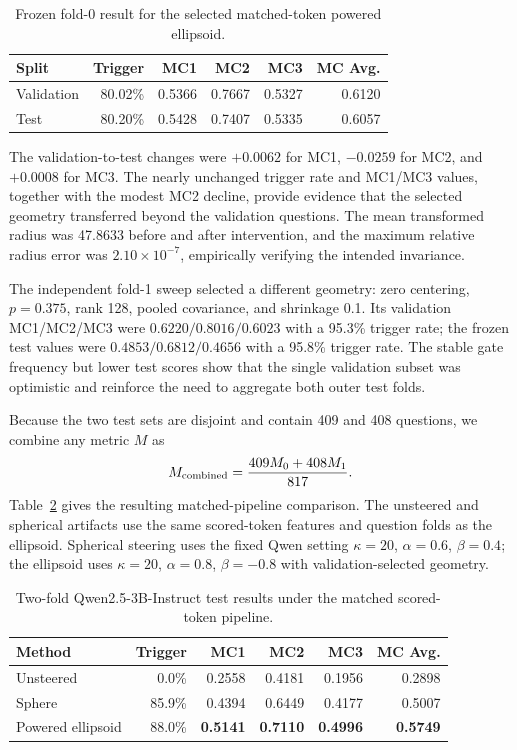 \documentclass[11pt]{article}
\begin{document}
\begin{table}[ht]
\centering
\caption{Frozen fold-0 result for the selected matched-token powered ellipsoid.}
\label{tab:powered-result}
\begin{tabular}{lrrrrr}
\toprule
Split & Trigger & MC1 & MC2 & MC3 & MC Avg.\\
\midrule
Validation & 80.02\% & 0.5366 & 0.7667 & 0.5327 & 0.6120\\
Test       & 80.20\% & 0.5428 & 0.7407 & 0.5335 & 0.6057\\
\bottomrule
\end{tabular}
\end{table}

The validation-to-test changes were $+0.0062$ for MC1, $-0.0259$ for MC2,
and $+0.0008$ for MC3. The nearly unchanged trigger rate and MC1/MC3 values,
together with the modest MC2 decline, provide evidence that the selected
geometry transferred beyond the validation questions. The mean transformed
radius was 47.8633 before and after intervention, and the maximum relative
radius error was $2.10\times10^{-7}$, empirically verifying the intended
invariance.

The independent fold-1 sweep selected a different geometry: zero centering,
$p=0.375$, rank 128, pooled covariance, and shrinkage 0.1. Its validation
MC1/MC2/MC3 were $0.6220/0.8016/0.6023$ with a 95.3\% trigger rate; the frozen
test values were $0.4853/0.6812/0.4656$ with a 95.8\% trigger rate. The stable
gate frequency but lower test scores show that the single validation subset
was optimistic and reinforce the need to aggregate both outer test folds.

Because the two test sets are disjoint and contain 409 and 408 questions, we
combine any metric $M$ as
\begin{equation}
 M_{\rm combined}=\frac{409M_0+408M_1}{817}.
\end{equation}
Table~\ref{tab:combined-comparison} gives the resulting matched-pipeline
comparison. The unsteered and spherical artifacts use the same scored-token
features and question folds as the ellipsoid. Spherical steering uses the
fixed Qwen setting $\kappa=20$, $\alpha=0.6$, $\beta=0.4$; the ellipsoid uses
$\kappa=20$, $\alpha=0.8$, $\beta=-0.8$ with validation-selected geometry.

\begin{table}[ht]
\centering
\caption{Two-fold Qwen2.5-3B-Instruct test results under the matched
scored-token pipeline.}
\label{tab:combined-comparison}
\begin{tabular}{lrrrrr}
\toprule
Method & Trigger & MC1 & MC2 & MC3 & MC Avg.\\
\midrule
Unsteered & 0.0\% & 0.2558 & 0.4181 & 0.1956 & 0.2898\\
Sphere & 85.9\% & 0.4394 & 0.6449 & 0.4177 & 0.5007\\
Powered ellipsoid & 88.0\% & \textbf{0.5141} & \textbf{0.7110} &
\textbf{0.4996} & \textbf{0.5749}\\
\bottomrule
\end{tabular}
\end{table}
\end{document}
